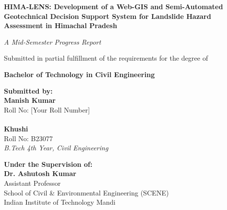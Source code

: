 \documentclass[12pt,a4paper]{report}
\begin{document}
\begin{titlepage}
\centering
\vspace*{0.5cm}

{\Large \textbf{HIMA-LENS: Development of a Web-GIS and Semi-Automated Geotechnical Decision Support System for Landslide Hazard Assessment in Himachal Pradesh}\par}

\vspace{1.2cm}
{\large \textit{A Mid-Semester Progress Report}\par}
\vspace{0.3cm}
{\normalsize Submitted in partial fulfillment of the requirements for the degree of\par}
\vspace{0.3cm}
{\large \textbf{Bachelor of Technology in Civil Engineering}\par}

\vspace{1.5cm}

\begin{minipage}[t]{0.48\textwidth}
\textbf{Submitted by:}\\
\textbf{Manish Kumar}\\
Roll No: [Your Roll Number]\\
\vspace{0.2cm}\\
\textbf{Khushi}\\
Roll No: B23077\\
\textit{B.Tech 4th Year, Civil Engineering}
\end{minipage}
\hfill
\begin{minipage}[t]{0.48\textwidth}
\raggedleft
\textbf{Under the Supervision of:}\\
\textbf{Dr. Ashutosh Kumar}\\
Assistant Professor\\
School of Civil \& Environmental Engineering (SCENE)\\
Indian Institute of Technology Mandi
\end{minipage}

\vspace{2.0cm}

\begin{center}
\end{center}


\end{titlepage}
\end{document}

